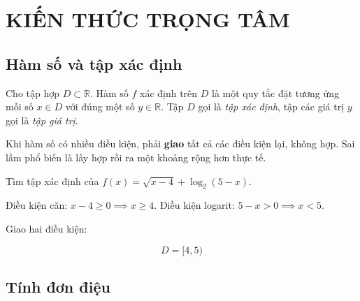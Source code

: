 \documentclass[11pt, a4paper]{article}
\begin{document}
\section{KIẾN THỨC TRỌNG TÂM}

\subsection{Hàm số và tập xác định}

\begin{dinhnghia}[{1 — Hàm số}]
Cho tập hợp $D \subset \mathbb{R}$. Hàm số $f$ xác định trên $D$ là một quy tắc đặt tương ứng mỗi số $x \in D$ với đúng một số $y \in \mathbb{R}$. Tập $D$ gọi là \emph{tập xác định}, tập các giá trị $y$ gọi là \emph{tập giá trị}.
\end{dinhnghia}
\begin{dinhly}

 Khi hàm số có nhiều điều kiện, phải \textbf{giao} tất cả các điều kiện lại, không hợp. Sai lầm phổ biến là lấy hợp rồi ra một khoảng rộng hơn thực tế.
\end{dinhly}
\begin{vidu}[{1}]
Tìm tập xác định của $f(x) = \sqrt{x - 4} + \log_2(5 - x)$.

Điều kiện căn: $x - 4 \ge 0 \implies x \ge 4$. Điều kiện logarit: $5 - x > 0 \implies x < 5$.

Giao hai điều kiện:

$$D = [4, 5)$$

\end{vidu}
\subsection{Tính đơn điệu}
\end{document}
